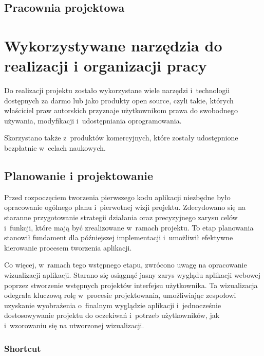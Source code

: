 \subsection{Pracownia projektowa}


\section{Wykorzystywane narzędzia do realizacji i organizacji pracy}

Do realizacji projektu zostało wykorzystane wiele narzędzi i~technologii
dostępnych za darmo lub jako produkty open source, czyli takie,
których właściciel praw autorskich przyznaje użytkownikom prawa
do swobodnego używania, modyfikacji i~udostępniania oprogramowania.

Skorzystano także z~produktów komercyjnych, które zostały udostępnione
bezpłatnie w~celach naukowych.

\subsection{Planowanie i projektowanie}

Przed rozpoczęciem tworzenia pierwszego kodu aplikacji niezbędne było
opracowanie ogólnego planu i~pierwotnej wizji projektu. Zdecydowano
się na staranne przygotowanie strategii działania oraz precyzyjnego
zarysu celów i~funkcji, które mają być zrealizowane w~ramach projektu.
To etap planowania stanowił fundament dla późniejszej implementacji
i~umożliwił efektywne kierowanie procesem tworzenia aplikacji.

Co więcej, w~ramach tego wstępnego etapu, zwrócono uwagę na
opracowanie wizualizacji aplikacji. Starano się osiągnąć jasny
zarys wyglądu aplikacji webowej poprzez stworzenie wstępnych projektów
interfejsu użytkownika. Ta wizualizacja odegrała kluczową rolę
w~procesie projektowania, umożliwiając zespołowi uzyskanie wyobrażenia
o~finalnym wyglądzie aplikacji i~jednocześnie dostosowywanie projektu
do oczekiwań i~potrzeb użytkowników, jak i~wzorowaniu się na utworzonej
wizualizacji.

\subsubsection{Shortcut}

